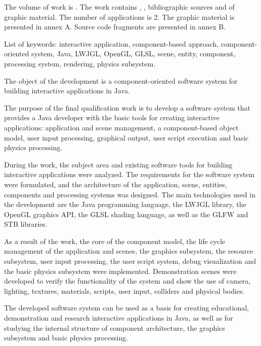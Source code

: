   
The volume of work is . The work contains , ,  bibliographic sources and  of graphic material. The number of applications is 2. The graphic material is presented in annex A. Source code fragments are presented in annex B.

List of keywords: interactive application, component-based approach, component-oriented system, Java, LWJGL, OpenGL, GLSL, scene, entity, component, processing system, rendering, physics subsystem.

The object of the development is a component-oriented software system for building interactive applications in Java.

The purpose of the final qualification work is to develop a software system that provides a Java developer with the basic tools for creating interactive applications: application and scene management, a component-based object model, user input processing, graphical output, user script execution and basic physics processing.

During the work, the subject area and existing software tools for building interactive applications were analyzed. The requirements for the software system were formulated, and the architecture of the application, scene, entities, components and processing systems was designed. The main technologies used in the development are the Java programming language, the LWJGL library, the OpenGL graphics API, the GLSL shading language, as well as the GLFW and STB libraries.

As a result of the work, the core of the component model, the life cycle management of the application and scenes, the graphics subsystem, the resource subsystem, user input processing, the user script system, debug visualization and the basic physics subsystem were implemented. Demonstration scenes were developed to verify the functionality of the system and show the use of camera, lighting, textures, materials, scripts, user input, colliders and physical bodies.

The developed software system can be used as a basis for creating educational, demonstration and research interactive applications in Java, as well as for studying the internal structure of component architecture, the graphics subsystem and basic physics processing.
